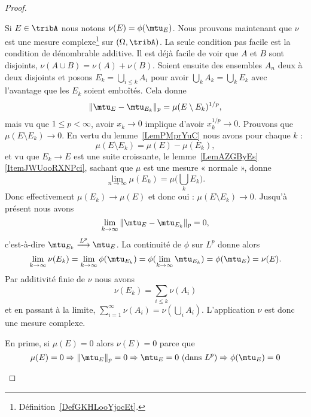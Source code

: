 \begin{proof}
\begin{subproof}
		Si \( E\in\tribA\) nous notons \( \nu(E)=\phi(\mtu_E)\). Nous prouvons maintenant que \( \nu\) est une mesure complexe\footnote{Définition~\ref{DefGKHLooYjocEt}.} sur \( (\Omega,\tribA)\). La seule condition pas facile est la condition de dénombrable additive. Il est déjà facile de voir que \( A\) et \( B\) sont disjoints, \( \nu(A\cup B)=\nu(A)+\nu(B)\). Soient ensuite des ensembles \( A_n\) deux à deux disjoints et posons \( E_k=\bigcup_{i\leq k}A_i\) pour avoir \( \bigcup_kA_k=\bigcup_kE_k\) avec l'avantage que les \( E_k\) soient emboîtés. Cela donne
		\begin{equation}
			\| \mtu_E-\mtu_{E_k} \|_p=\mu(E\setminus E_k)^{1/p},
		\end{equation}
		mais vu que \( 1\leq p<\infty\), avoir \( x_k\to 0\) implique d'avoir \( x_k^{1/p}\to 0\). Prouvons que \( \mu(E\setminus E_k)\to 0\). En vertu du lemme~\ref{LemPMprYuC} nous avons pour chaque \( k\) :
		\begin{equation}
			\mu(E\setminus E_k)=\mu(E)-\mu(E_k),
		\end{equation}
		et vu que \( E_k\to E\) est une suite croissante, le lemme~\ref{LemAZGByEs}\ref{ItemJWUooRXNPci}, sachant que \( \mu\) est une mesure « normale », donne
		\begin{equation}
			\lim_{n\to \infty} \mu(E_k)=\mu\big( \bigcup_kE_k \big).
		\end{equation}
		Donc effectivement \( \mu(E_k)\to \mu(E)\) et donc oui : \( \mu(E\setminus E_k)\to 0\). Jusqu'à présent nous avons
		\begin{equation}
			\lim_{k\to \infty} \| \mtu_E-\mtu_{E_k} \|_p=0,
		\end{equation}
		c'est-à-dire \( \mtu_{E_k}\stackrel{L^p}{\longrightarrow}\mtu_E\). La continuité de \( \phi\) sur \( L^p\) donne alors
		\begin{equation}
			\lim_{k\to \infty} \nu(E_k)=\lim_{k\to \infty} \phi(\mtu_{E_k})=\phi(\lim_{k\to \infty} \mtu_{E_k})=\phi(\mtu_E)=\nu(E).
		\end{equation}
		Par additivité finie de \( \nu\) nous avons
		\begin{equation}
			\nu(E_k)=\sum_{i\leq k}\nu(A_i)
		\end{equation}
		et en passant à la limite, \( \sum_{i=1}^{\infty}\nu(A_i)=\nu(\bigcup_{i}A_i)\). L'application \( \nu\) est donc une mesure complexe.


		En prime, si \( \mu(E)=0\) alors \( \nu(E)=0\) parce que
		\begin{equation}
			\mu(E)=0\Rightarrow \| \mtu_E \|_p=0\Rightarrow \mtu_E=0\text{ (dans } L^p\text{)}\Rightarrow\phi(\mtu_E)=0
		\end{equation}


\end{subproof}
\end{proof}

